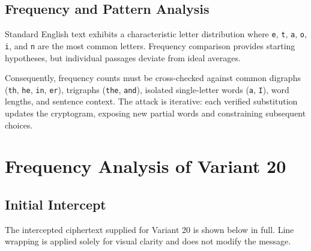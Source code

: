 \documentclass[11pt,a4paper]{article}
\begin{document}
\subsection{Frequency and Pattern Analysis}

Standard English text exhibits a characteristic letter distribution where \texttt{e}, \texttt{t}, \texttt{a}, \texttt{o}, \texttt{i}, and \texttt{n} are the most common letters. Frequency comparison provides starting hypotheses, but individual passages deviate from ideal averages. 

Consequently, frequency counts must be cross-checked against common digraphs (\texttt{th}, \texttt{he}, \texttt{in}, \texttt{er}), trigraphs (\texttt{the}, \texttt{and}), isolated single-letter words (\texttt{a}, \texttt{I}), word lengths, and sentence context. The attack is iterative: each verified substitution updates the cryptogram, exposing new partial words and constraining subsequent choices.

\newpage
\section{Frequency Analysis of Variant 20}

\subsection{Initial Intercept}

The intercepted ciphertext supplied for Variant 20 is shown below in full. Line wrapping is applied solely for visual clarity and does not modify the message.
\end{document}
